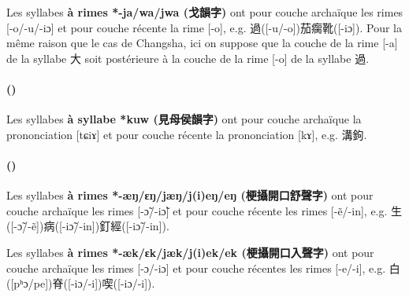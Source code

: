 \documentclass{scrbook}
\newcounter{c}[subsubsection]
\newcommand{\stpc}[1]{\stepcounter{#1}}
\newcommand{\termyyx}[1]{\textbf{#1}}
\begin{document}
\begin{sloppypar}
Les syllabes \termyyx{à rimes *-ja/wa/jwa (戈韻字)} ont pour couche archaïque les rimes [-o/-u/-iɔ] et pour couche récente la rime [-o], e.g. 過([-u/-o])茄瘸靴([-iɔ]). Pour la même raison que le cas de Changsha, ici on suppose que la couche de la rime [-a] de la syllabe 大 soit postérieure à la couche de la rime [-o] de la syllabe 過.

\stpc{c}\paragraph{()}
Les syllabes \termyyx{à syllabe *kuw (見母侯韻字)} ont pour couche archaïque la prononciation [tɕiɤ] et pour couche récente la prononciation [kɤ], e.g. 溝鉤.

\stpc{c}\paragraph{()}
Les syllabes \termyyx{à rimes *-æŋ/ɛŋ/jæŋ/j(i)eŋ/eŋ (梗攝開口舒聲字)} ont pour couche archaïque les rimes [-ɔ̃/-iɔ̃] et pour couche récente les rimes [-ẽ/-in], e.g. 生([-ɔ̃/-ẽ])病([-iɔ̃/-in])釘經([-iɔ̃/-in]).

Les syllabes \termyyx{à rimes *-æk/ɛk/jæk/j(i)ek/ek (梗攝開口入聲字)} ont pour couche archaïque les rimes [-ɔ/-iɔ] et pour couche récentes les rimes [-e/-i], e.g. 白([pʰɔ/pe])脊([-iɔ/-i])喫([-iɔ/-i]). 


\end{sloppypar}
\end{document}
